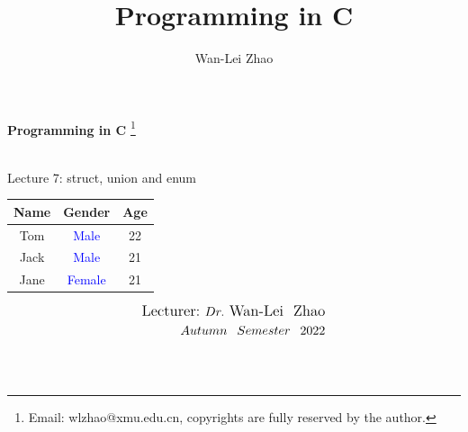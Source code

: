 \documentclass[]{beamer}
\title{Programming in C}
\author{Wan-Lei Zhao}
\newcommand\blfootnote[1]{
  \begingroup
  \renewcommand\thefootnote{}\footnote{#1}
  \addtocounter{footnote}{-1}
  \endgroup
}
\begin{document}
\begin{frame}
   \begin{center}
    \vspace{24pt}
    \Huge\textbf{Programming in C}\blfootnote{Email: wlzhao@xmu.edu.cn, copyrights are fully reserved by the author.}\\
     \Huge{Lecture 7: struct, union and enum}
     \begin{table}
     \scriptsize{
     	\begin{tabular}{|c|c|c|}\hline
     	Name&Gender&Age \\\hline\hline
     	Tom & \textcolor{blue}{Male} & 22 \\\hline
     	Jack& \textcolor{blue}{Male} &21 \\\hline
     	Jane& \textcolor{blue}{Female} & 21 \\\hline
     	\end{tabular}
     	}
     \end{table}
    \vspace{36pt}
  \end{center}
  \begin{align*}
   \vspace{18pt}
      \large{\mbox{Lecturer:}~Dr.~\mbox{Wan-Lei~~Zhao}} \\
      \large{Autumn~~Semester~~2022} \\
   \vspace{30pt}
  \end{align*}
\end{frame}





\section{}
\end{document}
